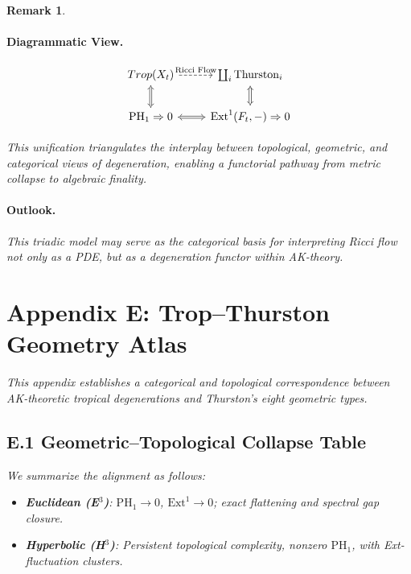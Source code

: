 \documentclass[11pt]{article}
\newtheorem{remark}[theorem]{Remark}
\begin{document}
\begin{remark}
\paragraph{Diagrammatic View.}
\[
\begin{tikzcd}
Trop(X_t) \arrow[d, Leftrightarrow] \arrow[r, dashed, "\text{Ricci Flow}"] & \coprod_i \text{Thurston}_i \arrow[d, Leftrightarrow] \\
\mathrm{PH}_1 \Rightarrow 0 \arrow[r, Leftrightarrow] & \mathrm{Ext}^1(F_t, -) \Rightarrow 0
\end{tikzcd}
\]

This unification triangulates the interplay between topological, geometric, and categorical views of degeneration, enabling a functorial pathway from metric collapse to algebraic finality.

\paragraph{Outlook.}
This triadic model may serve as the categorical basis for interpreting Ricci flow not only as a PDE, but as a degeneration functor within AK-theory.




\section*{Appendix E: Trop–Thurston Geometry Atlas}

This appendix establishes a categorical and topological correspondence  
between AK-theoretic tropical degenerations and Thurston's eight geometric types.

\subsection*{E.1 Geometric–Topological Collapse Table}

We summarize the alignment as follows:

\begin{itemize}
  \item \textbf{Euclidean (E$^3$)}:  
  $\mathrm{PH}_1 \to 0$, $\mathrm{Ext}^1 \to 0$; exact flattening and spectral gap closure.

  \item \textbf{Hyperbolic (H$^3$)}:  
  Persistent topological complexity, nonzero $\mathrm{PH}_1$, with Ext-fluctuation clusters.


\end{itemize}
\end{remark}
\end{document}
